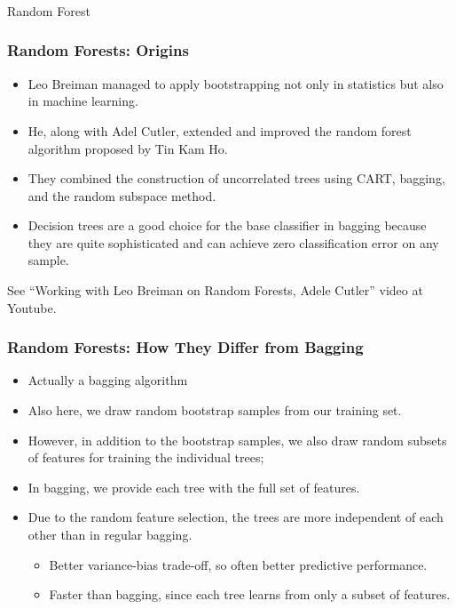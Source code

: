 \begin{frame}[fragile]\frametitle{}
\begin{center}
{\Large Random Forest}
\end{center}
\end{frame}


\begin{frame}[fragile]\frametitle{Random Forests: Origins}
\begin{itemize}
\item Leo Breiman managed to apply bootstrapping not only in statistics but also in machine learning. \item He, along with Adel Cutler, extended and improved the random forest algorithm proposed by Tin Kam Ho. 
\item They combined the construction of uncorrelated trees using CART, bagging, and the random subspace method.
\item Decision trees are a good choice for the base classifier in bagging because they are quite sophisticated and can achieve zero classification error on any sample. 

\end{itemize}

See ``Working with Leo Breiman on Random Forests, Adele Cutler'' video at Youtube.
\end{frame}



\begin{frame}[fragile]\frametitle{Random Forests: How They Differ from Bagging}
\begin{itemize}
\item Actually a bagging algorithm
\item Also here, we draw random bootstrap samples from our training set.
\item However, in addition to the bootstrap samples, we also draw random subsets of features for training the individual trees;
\item In bagging, we provide each tree with the full set of features.
\item Due to the random feature selection, the trees are more independent of each other than in regular bagging.
\begin{itemize}
\item Better variance-bias trade-off, so often better predictive performance.
\item Faster than bagging, since each tree learns from only a subset of features.
\end{itemize}
\end{itemize}
\end{frame}




